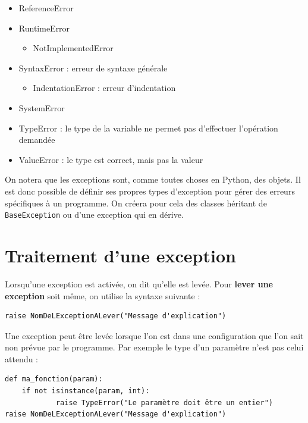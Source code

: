 \documentclass[12pt, a4paper]{article}
\begin{document}
{\begin{footnotesize}
\begin{minipage}{0.9\textwidth}
\begin{itemize}
\begin{itemize}
\begin{itemize}
						\item PermissionError : pas les droit pour effectuer l'opération sur un fichier
					\end{itemize}
					\item ReferenceError
					\item RuntimeError
					\begin{itemize}
						\item NotImplementedError
					\end{itemize}
					\item SyntaxError : erreur de syntaxe générale
					\begin{itemize}
						\item IndentationError : erreur d'indentation
					\end{itemize}
					\item SystemError
					\item TypeError : le type de la variable ne permet pas d'effectuer l'opération demandée
					\item ValueError : le type est correct, mais pas la valeur
				\end{itemize}
			\end{itemize}
		\end{minipage}
	\end{footnotesize}
}

On notera que les exceptions sont, comme toutes choses en Python, des objets. Il est donc possible de définir ses propres types d'exception pour gérer des erreurs spécifiques à un programme. On créera pour cela des classes héritant de \lstinline{BaseException} ou d'une exception qui en dérive.


\section{Traitement d'une exception}
Lorsqu'une exception est activée, on dit qu'elle est levée. Pour \textbf{lever une exception} soit même, on utilise la syntaxe suivante :
\begin{lstlisting}
raise NomDeLExceptionALever("Message d'explication")
\end{lstlisting}

Une exception peut être levée lorsque l'on est dans une configuration que l'on sait non prévue par le programme. Par exemple le type d'un paramètre n'est pas celui attendu :
\begin{lstlisting}
def ma_fonction(param):
    if not isinstance(param, int):
			raise TypeError("Le paramètre doit être un entier")
raise NomDeLExceptionALever("Message d'explication")
\end{lstlisting}
\end{document}
